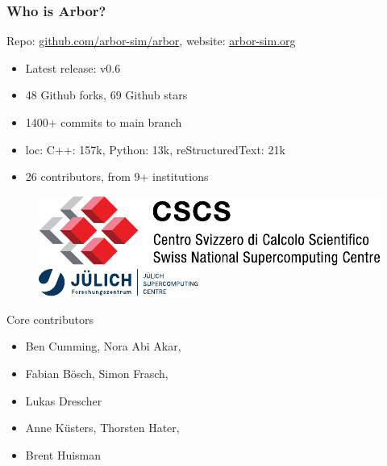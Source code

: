 \documentclass[t]{beamer}
\begin{document}
\begin{frame}
    \frametitle{Who is Arbor?}

    Repo: \url{github.com/arbor-sim/arbor}, website: \url{arbor-sim.org}
    \begin{itemize}
        \item Latest release: v0.6
        \item 48 Github forks, 69 Github stars
        \item 1400+ commits to main branch
        \item loc: C++: 157k, Python: 13k, reStructuredText: 21k
        \item 26 contributors, from 9+ institutions
    \end{itemize}

    \begin{figure}
        \begin{center}
            \includegraphics[width=\linewidth]{cscs_logo.pdf}
        \end{center}
        \vspace{0.1\baselineskip}
        \begin{center}
            \includegraphics[width=\linewidth]{Logo_FZJ_JSC.pdf}
        \end{center}
    \end{figure}

    Core contributors
    \begin{itemize}
        \item Ben Cumming, Nora Abi Akar,
        \item[] Fabian Bösch, Simon Frasch,
        \item[] Lukas Drescher
        \item Anne Küsters, Thorsten Hater,
        \item[] Brent Huisman
    \end{itemize}
    

\end{frame}
\end{document}
